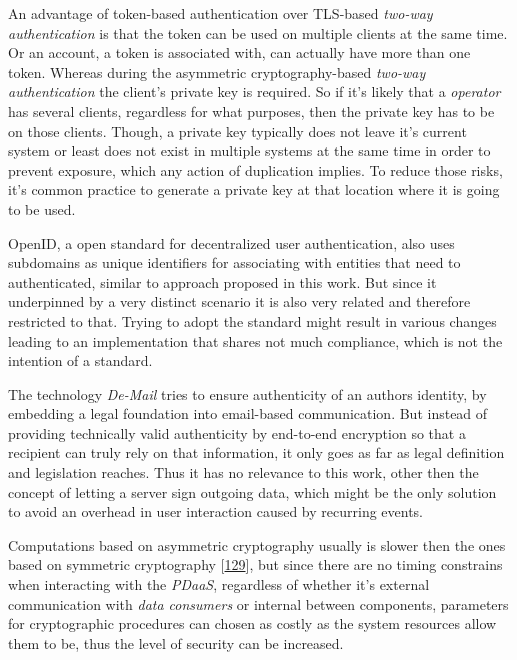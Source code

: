 \documentclass[12pt,english,a4paper,titlepage,cleardoublepage=empty,dottedtoc]{report}
\begin{document}
An advantage of token-based authentication over TLS-based \emph{two-way
authentication} is that the token can be used on multiple clients at the
same time. Or an account, a token is associated with, can actually have
more than one token. Whereas during the asymmetric cryptography-based
\emph{two-way authentication} the client's private key is required. So
if it's likely that a \emph{operator} has several clients, regardless
for what purposes, then the private key has to be on those clients.
Though, a private key typically does not leave it's current system or
least does not exist in multiple systems at the same time in order to
prevent exposure, which any action of duplication implies. To reduce
those risks, it's common practice to generate a private key at that
location where it is going to be used.

OpenID, a open standard for decentralized user authentication, also uses
subdomains as unique identifiers for associating with entities that need
to authenticated, similar to approach proposed in this work. But since
it underpinned by a very distinct scenario it is also very related and
therefore restricted to that. Trying to adopt the standard might result
in various changes leading to an implementation that shares not much
compliance, which is not the intention of a standard.

The technology \emph{De-Mail} tries to ensure authenticity of an authors
identity, by embedding a legal foundation into email-based
communication. But instead of providing technically valid authenticity
by end-to-end encryption so that a recipient can truly rely on that
information, it only goes as far as legal definition and legislation
reaches. Thus it has no relevance to this work, other then the concept
of letting a server sign outgoing data, which might be the only solution
to avoid an overhead in user interaction caused by recurring events.

Computations based on asymmetric cryptography usually is slower then the
ones based on symmetric cryptography
{[}\protect\hyperlink{ref-book_2014_chapter-10-5-asym-random-number-gen}{129}{]},
but since there are no timing constrains when interacting with the
\emph{PDaaS}, regardless of whether it's external communication with
\emph{data consumers} or internal between components, parameters for
cryptographic procedures can chosen as costly as the system resources
allow them to be, thus the level of security can be increased.
\end{document}
